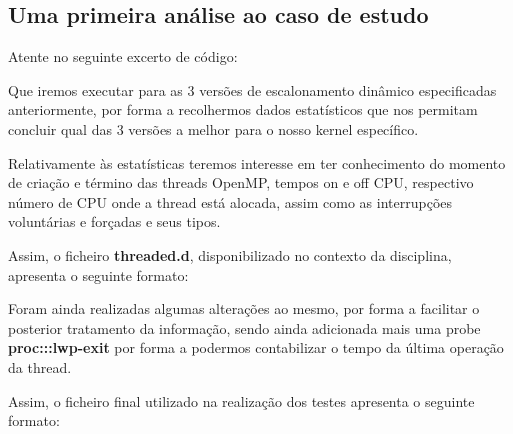 \documentclass[a4paper]{article}
\begin{document}
\subsection{Uma primeira análise ao caso de estudo}
\label{primeiraanalise}
Atente no seguinte excerto de código:

Que iremos executar para as 3 versões de escalonamento dinâmico especificadas anteriormente, por forma a recolhermos dados estatísticos que nos permitam concluir qual das 3 versões a melhor para o nosso kernel específico.\par
Relativamente às estatísticas teremos interesse em ter conhecimento do momento de criação e término das threads OpenMP, tempos on e off CPU, respectivo número de CPU onde a thread está alocada, assim como as interrupções voluntárias e forçadas e seus tipos.\par 
Assim, o ficheiro \textbf{threaded.d}, disponibilizado no contexto da disciplina, apresenta o seguinte formato:


Foram ainda realizadas algumas alterações ao mesmo, por forma a facilitar o posterior tratamento da informação, sendo ainda adicionada mais uma probe \textbf{proc:::lwp-exit} por forma a podermos contabilizar o tempo da última operação da thread.\par 
Assim, o ficheiro final utilizado na realização dos testes apresenta o seguinte formato:\par 
\end{document}
